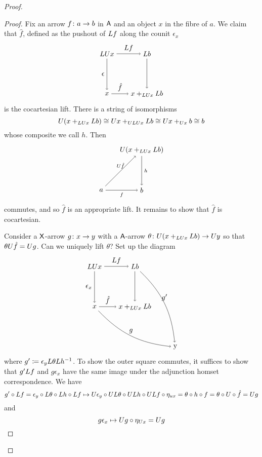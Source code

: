 \documentclass{amsart}
\begin{document}
\begin{proof}
\begin{proof}
  Fix an arrow $ f \colon a \to b $ in $ \mathsf{A} $
  and an object $ x $ in the fibre of $ a $. We
  claim that $ \hat{f} $, defined as the pushout
  of $ L f $
  along the counit $ \epsilon_x $
  \[
    \begin{tikzpicture}
      \node (ul) at (0,2) {$ \L \U x $};
      \node (ll) at (0,0) {$ x $};
      \node (ur) at (2,2) {$ \L b $};
      \node (lr) at (2,0) {$ x +_{\L\U x} \L b$};
      \draw [->] (ul) to node [left] {$ \epsilon $} (ll);
      \draw [->] (ul) to node [above] {$ \L f $} (ur);
      \draw [->] (ll) to node [above] {$ \hat{f} $} (lr);
      \draw [->] (ur) to (lr);
    \end{tikzpicture}
  \]
  is the cocartesian lift. There is a string of
  isomorphisms
  \[
    U ( x +_{LU x} L b ) \cong
    U x +_{ULU x} L b \cong
    U x +_{U x} b \cong
    b
  \]
  whose composite we call $ h $.  Then
  \[
    \begin{tikzpicture}
      \node (a) at (0,0) {$ a $};
      \node (b) at (2,0) {$ b $};
      \node (c) at (2,2) {$ \U ( x+_{\L\U x} \L b ) $};
      \path[->,font=\scriptsize]
      (a) edge node[below]{$ f $} (b)
      (a) edge node[above]{$ \U\hat{f} $} (c)
      (c) edge node[right]{$ h $} (b);
    \end{tikzpicture}
  \]
  commutes, and so $ \hat{f} $ is an appropriate
  lift. It remains to show that $ \hat{f} $ is
  cocartesian.

  Consider a $ \mathsf{X} $-arrow $ g \colon x \to y $
  with a $ \mathsf{A} $-arrow
  $ \theta \colon U( x +_{LU x} L b ) \to U y $ so
  that $ \theta U \hat{f} = U g $.  Can we
  uniquely lift $ \theta $? Set up the diagram
  \[
    \begin{tikzpicture}
      \node (ul) at (0,2) {$ \L\U x $};
      \node (ll) at (0,0) {$ x $};
      \node (ur) at (2,2) {$ \L b $};
      \node (lr) at (2,0) {$ x +_{\L\U x} \L b$};
      \node (comp) at (4,-2) {y};
      \draw [->] (ul) to node [left] {$ \epsilon_x $} (ll);
      \draw [->] (ul) to node [above] {$ \L f $} (ur);
      \draw [->] (ll) to node [above] {$ \hat{f} $} (lr);
      \draw [->] (ur) to (lr);
      \draw [->] (ll) to [bend right=20] node [above] {$ g $} (comp);
      \draw [->] (ur) to [bend left=20] node [above] {$ g' $} (comp);
    \end{tikzpicture}
  \] 
  where $ g' \coloneqq \epsilon_y L\theta L h^{-1} $.
  To show the outer square commutes, it suffices
  to show that $ g' L f $ and $ g \epsilon_x $
  have the same image under the adjunction homset
  correspondence.  We have
  \[
    g' \circ L f =
    \epsilon_y \circ L\theta \circ L h \circ L f
    \mapsto
    U\epsilon_y \circ UL\theta \circ UL h
      \circ UL f \circ\eta_{ux}
    = \theta \circ h \circ f   
    = \theta \circ U \circ \hat{f} 
    = U g
  \]
  and 
  \[
    g \epsilon_x
    \mapsto
    U g \circ \eta_{U x}
    = U g
  \]
\end{proof}


\end{proof}
\end{document}
